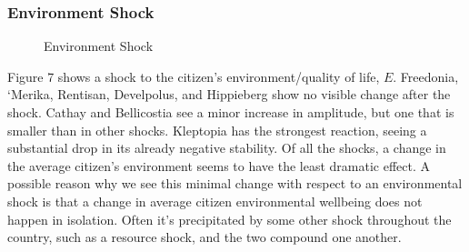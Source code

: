 \documentclass[12pt]{article}
\begin{document}
\begin{spacing}{1.5}

\subsubsection{Environment Shock}

\begin{figure}
\centering
{} 
\caption{Environment Shock}

\end{figure}


Figure 7 shows a shock to the citizen's environment/quality of life, $E$. Freedonia, `Merika, Rentisan, Develpolus, and Hippieberg show no visible change after the shock. Cathay and Bellicostia see a minor increase in amplitude, but one that is smaller than in other shocks. Kleptopia has the strongest reaction, seeing a substantial drop in its already negative stability. Of all the shocks, a change in the average citizen's environment seems to have the least dramatic effect. A possible reason why we see this minimal change with respect to an environmental shock is that a change in average citizen environmental wellbeing does not happen in isolation. Often it's precipitated by some other shock throughout the country, such as a resource shock, and the two compound one another. 


\end{spacing}
\end{document}
